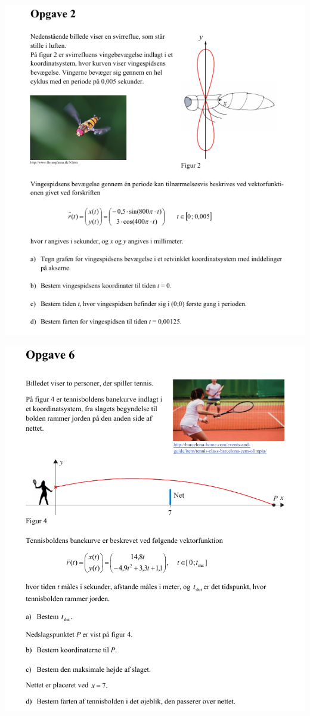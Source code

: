 \documentclass[a4paper, 12pt]{article}
\begin{document}
\begin{center}
\includegraphics[width=.9\linewidth]{img/opg3.png}
\end{center}
\begin{center}
\includegraphics[width=.9\linewidth]{img/opg4.png}
\end{center}
\end{document}
